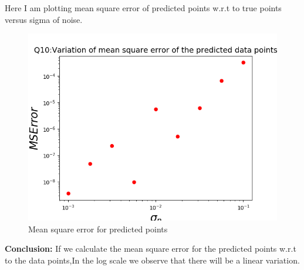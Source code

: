 \documentclass[11pt, a4paper]{article}
\begin{document}
Here I am plotting mean square error of predicted points w.r.t to true points versus sigma of noise.

\begin{figure}[!tbh]
   	\centering
   	\includegraphics[scale=0.5]{Figure_1.png}  %
   	\caption{Mean square error for predicted points}
   	\label{fig:pred mean square}
   \end{figure}
   
\textbf{Conclusion:}
If we calculate the mean square error for the predicted points w.r.t to the data points,In the log scale we observe that there will be a linear variation.


 
\end{document}

